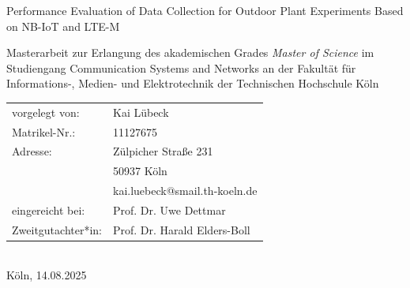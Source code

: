 \documentclass[12pt, english, openany]{book}
\begin{document}

\begin{titlepage}
    \sffamily%
    \begin{center}
    \end{center}
    \vfill
    \begin{huge}
        Performance Evaluation of Data Collection for Outdoor Plant Experiments Based on NB-IoT and LTE-M\\[10mm]
    \end{huge}
    Masterarbeit zur Erlangung des akademischen Grades\newline
    \emph{Master of Science}\newline
    im Studiengang Communication Systems and Networks\newline
    an der Fakultät für Informations-, Medien- und Elektrotechnik\newline
    der Technischen Hochschule Köln
    \vfill
    \begin{tabular}{@{}ll}
        vorgelegt von:     & Kai Lübeck                    \\
        Matrikel-Nr.:      & 11127675                      \\
        Adresse:           & Zülpicher Straße 231          \\
                           & 50937 Köln                    \\
                           & kai.luebeck@smail.th-koeln.de \\[5mm]
        eingereicht bei:   & Prof. Dr. Uwe Dettmar         \\
        Zweitgutachter*in: & Prof. Dr. Harald Elders-Boll
    \end{tabular}
    \\[10mm]
    Köln, 14.08.2025%
    \rmfamily%
\end{titlepage}

\tableofcontents{}
\end{document}
